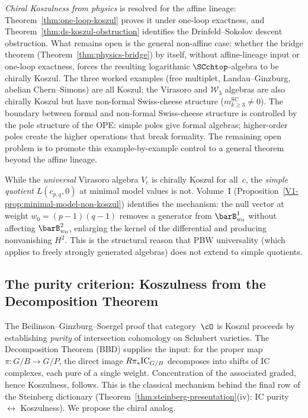 \begin{remark}
\label{rem:koszul-open-problem}
\emph{Chiral Koszulness from physics} is resolved for the affine
lineage: Theorem~\ref{thm:one-loop-koszul} proves it under one-loop
exactness, and Theorem~\ref{thm:ds-koszul-obstruction} identifies the
Drinfeld--Sokolov descent obstruction. What remains open is the
general non-affine case: whether the bridge theorem
(Theorem~\ref{thm:physics-bridge}) by itself, without affine-lineage
input or one-loop exactness, forces the resulting logarithmic
$\SCchtop$-algebra to be chirally Koszul. The three worked examples
(free multiplet, Landau--Ginzburg, abelian Chern--Simons) are all
Koszul; the Virasoro and $\mathcal{W}_3$ algebras are also chirally
Koszul but have non-formal Swiss-cheese structure
($m_{k \geq 3}^{\mathrm{SC}} \neq 0$). The boundary between formal
and non-formal Swiss-cheese structure is controlled by the pole
structure of the OPE: simple poles give formal algebras; higher-order
poles create the higher operations that break formality. The
remaining open problem is to promote this example-by-example control to
a general theorem beyond the affine lineage.
\end{remark}

\begin{remark}
\label{rem:vol2-minimal-model-non-koszul}
While the \emph{universal} Virasoro algebra $V_c$ is chirally Koszul
for all~$c$, the \emph{simple quotient} $L(c_{p,q}, 0)$ at minimal
model values is not. Volume~I
\textup{(}Proposition~\textup{\ref*{V1-prop:minimal-model-non-koszul})}
identifies the mechanism: the null vector at weight
$w_0 = (p{-}1)(q{-}1)$ removes a generator from $\barB^1_{w_0}$
without affecting $\barB^2_{w_0}$, enlarging the kernel of the
differential and producing nonvanishing $H^2$. This is the
structural reason that PBW universality
\textup{(}which applies to freely strongly generated algebras\textup{)}
does not extend to simple quotients.
\end{remark}

\subsection{The purity criterion: Koszulness from the Decomposition Theorem}
\label{subsec:purity-koszulness}

The Beilinson--Ginzburg--Soergel proof that category~$\cO$ is Koszul
proceeds by establishing \emph{purity} of intersection cohomology on
Schubert varieties. The Decomposition Theorem (BBD) supplies the input:
for the proper map $\pi\colon G/B \to G/P$, the direct image
$R\pi_* \mathrm{IC}_{G/B}$ decomposes into shifts of IC complexes, each pure
of a single weight. Concentration of the associated graded, hence
Koszulness, follows. This is the classical mechanism behind the
final row of the Steinberg dictionary
(Theorem~\ref{thm:steinberg-presentation}(iv):
IC purity $\leftrightarrow$ Koszulness).
We propose the chiral analog.

